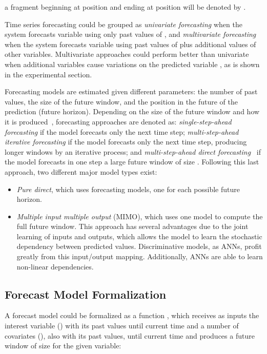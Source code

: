 \documentclass[energies,article,accept,moreauthors,pdftex,12pt,a4paper]{mdpi}
\newcommand{\anns}{ANNs\xspace}
\begin{document}
\vspace {-12pt}

a fragment beginning at position  and ending at position 
will be denoted by .

Time series forecasting could be grouped as \emph{univariate forecasting} when
the system forecasts variable  using only past values of , and
\emph{multivariate forecasting} when the system forecasts variable  using
past values of  plus additional values of other variables. Multivariate
approaches could perform better than univariate when additional variables cause
variations on the predicted variable , as is shown in the experimental section.

Forecasting models are estimated given different parameters: the number of past
values, the size of the future window, and the position in the future of the
prediction (future horizon). Depending on the size of the future window and how it
is produced~\cite{2012:JESA:taieb}, forecasting approaches are denoted as: \linebreak 
\emph{single-step-ahead forecasting} if the model forecasts only the next time
step; \emph{multi-step-ahead iterative forecasting} if the model forecasts only
the next time step, producing longer windows by an iterative process; and
\emph{multi-step-ahead direct forecasting}~\cite{Cheng_Tan_Gao_Scripps_2006} if
the model forecasts in one step a large future window of size . Following
this last approach, two different major model types exist:

\begin{itemize}
\item \emph{Pure direct}, which uses  forecasting models, one for each
 possible future horizon.
\vspace {-9pt}
\item \emph{Multiple input multiple output} (MIMO), which uses one model to
 compute the full  future window. This approach has several advantages due to the joint learning of inputs and outputs, which allows the model to learn
 the stochastic dependency between predicted values. Discriminative models, as
 \anns, profit greatly from this
 input/output mapping. Additionally, \anns are able to learn non-linear
 dependencies.
\end{itemize}

\subsection{Forecast Model Formalization}\label{sec:forecastmodel}

A forecast model could be formalized as a function , which receives as inputs
the interest variable () with its past values until current time  and a
number  of covariates (), also with its
past values, until current time  and produces a future window of size 
for the given  variable:
\end{document}
